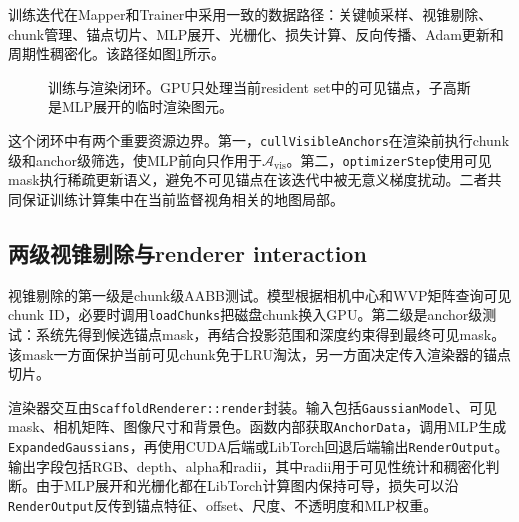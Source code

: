 训练迭代在Mapper和Trainer中采用一致的数据路径：关键帧采样、视锥剔除、chunk管理、锚点切片、MLP展开、光栅化、损失计算、反向传播、Adam更新和周期性稠密化。该路径如图\ref{fig:training_pipeline}所示。

\begin{figure}[htbp]
\centering
{}
\caption{训练与渲染闭环。GPU只处理当前resident set中的可见锚点，子高斯是MLP展开的临时渲染图元。}
\label{fig:training_pipeline}
\end{figure}

这个闭环中有两个重要资源边界。第一，\texttt{cullVisibleAnchors}在渲染前执行chunk级和anchor级筛选，使MLP前向只作用于$\mathcal{A}_{\mathrm{vis}}$。第二，\texttt{optimizerStep}使用可见mask执行稀疏更新语义，避免不可见锚点在该迭代中被无意义梯度扰动。二者共同保证训练计算集中在当前监督视角相关的地图局部。

\subsection{两级视锥剔除与renderer interaction}

视锥剔除的第一级是chunk级AABB测试。模型根据相机中心和WVP矩阵查询可见chunk ID，必要时调用\texttt{loadChunks}把磁盘chunk换入GPU。第二级是anchor级测试：系统先得到候选锚点mask，再结合投影范围和深度约束得到最终可见mask。该mask一方面保护当前可见chunk免于LRU淘汰，另一方面决定传入渲染器的锚点切片。

渲染器交互由\texttt{ScaffoldRenderer::render}封装。输入包括\texttt{GaussianModel}、可见mask、相机矩阵、图像尺寸和背景色。函数内部获取\texttt{AnchorData}，调用MLP生成\texttt{ExpandedGaussians}，再使用CUDA后端或LibTorch回退后端输出\texttt{RenderOutput}。输出字段包括RGB、depth、alpha和radii，其中radii用于可见性统计和稠密化判断。由于MLP展开和光栅化都在LibTorch计算图内保持可导，损失可以沿\texttt{RenderOutput}反传到锚点特征、offset、尺度、不透明度和MLP权重。

